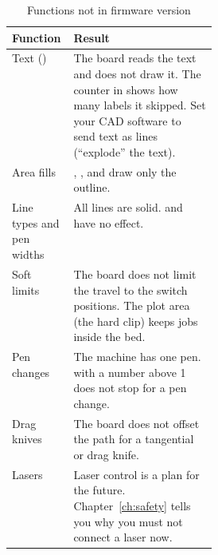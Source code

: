 \begin{table}[htbp]
\centering
\caption{Functions not in firmware version \fwversion}\label{tab:limits}
\begin{tabularx}{\linewidth}{@{}P{0.3\linewidth}L@{}}
\toprule
\textbf{Function} & \textbf{Result} \\
\midrule
Text () & The board reads the text and does not draw it. The
 counter in  shows how many labels it skipped.
Set your CAD software to send text as lines (``explode'' the text). \\
Area fills & , , and  draw only the outline. \\
Line types and pen widths & All lines are solid.  and  have no effect. \\
Soft limits & The board does not limit the travel to the switch positions.
The plot area (the hard clip) keeps jobs inside the bed. \\
Pen changes & The machine has one pen.  with a number above 1 does not
stop for a pen change. \\
Drag knives & The board does not offset the path for a tangential or drag knife. \\
Lasers & Laser control is a plan for the future. Chapter~\ref{ch:safety} tells
you why you must not connect a laser now. \\
\bottomrule
\end{tabularx}
\end{table}
